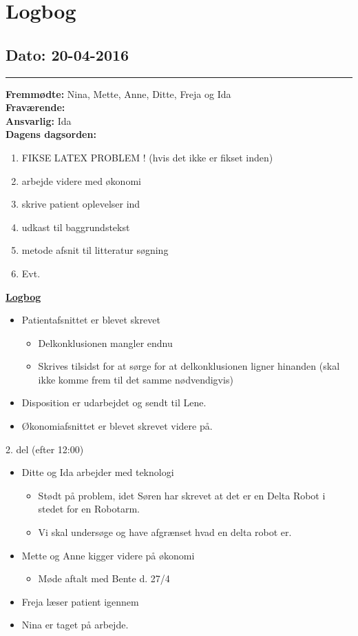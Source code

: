 \chapter{Logbog}
\section{Dato: 20-04-2016}
\hrule
\textbf{Fremmødte:} Nina, Mette, Anne, Ditte, Freja og Ida  \\
\textbf{Fraværende: } \\
\textbf{Ansvarlig:} Ida  \\
\textbf{Dagens dagsorden: }
\begin{enumerate}
	\item FIKSE LATEX PROBLEM ! (hvis det ikke er fikset inden)
	\item arbejde videre med økonomi
	\item skrive patient oplevelser ind
	\item udkast til baggrundstekst
	\item metode afsnit til litteratur søgning
	\item Evt. 
\end{enumerate}

\underline{\textbf{Logbog}}
\begin{itemize}
\item Patientafsnittet er blevet skrevet
\begin{itemize}
\item Delkonklusionen mangler endnu 
\item Skrives tilsidst for at sørge for at delkonklusionen ligner hinanden (skal ikke komme frem til det samme nødvendigvis)
\end{itemize}
\item Disposition er udarbejdet og sendt til Lene.
\item Økonomiafsnittet er blevet skrevet videre på.
\end{itemize}
2. del (efter 12:00)
\begin{itemize}
\item Ditte og Ida arbejder med teknologi
\begin{itemize}
\item Stødt på problem, idet Søren har skrevet at det er en Delta Robot i stedet for en Robotarm.
\item Vi skal undersøge og have afgrænset hvad en delta robot er.
\end{itemize}
\item Mette og Anne kigger videre på økonomi
\begin{itemize}
\item Møde aftalt med Bente d. 27/4
\end{itemize}
\item Freja læser patient igennem
\item Nina er taget på arbejde.
\end{itemize}
\newpage